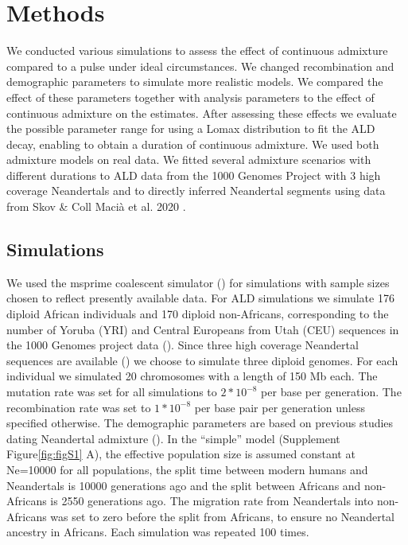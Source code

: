 \documentclass[]{article}
\begin{document}
\section{Methods}\label{methods}

We conducted various simulations to assess the effect of continuous
admixture compared to a pulse under ideal circumstances. We changed
recombination and demographic parameters to simulate more realistic
models. We compared the effect of these parameters together with
analysis parameters to the effect of continuous admixture on the
estimates. After assessing these effects we evaluate the possible
parameter range for using a Lomax distribution to fit the ALD decay,
enabling to obtain a duration of continuous admixture. We used both admixture models on real data. We fitted several admixture scenarios with different durations to ALD data from the 1000 Genomes Project with 3 high coverage Neandertals and to directly inferred Neandertal segments using data from Skov \& Coll Maci\`{a} et al. 2020 \cite{skov_nature_2020}.

\subsection{Simulations}\label{simulations}

We used the msprime coalescent simulator
(\cite{kelleher_efficient_2016}) for simulations with sample sizes
chosen to reflect presently available data. For ALD simulations we simulate 176 diploid
African individuals and 170 diploid non-Africans, corresponding to the
number of Yoruba (YRI) and Central Europeans from Utah (CEU)
sequences in the 1000 Genomes project data
(\cite{the_1000_genomes_project_consortium_global_2015}). Since three
high coverage Neandertal sequences are available
(\cite{prufer_complete_2013,prufer_high-coverage_2017,mafessoni_high_coverage_2020}) we choose to
simulate three diploid genomes. For each individual we simulated 20
chromosomes with a length of 150 Mb each. The mutation rate was set for
all simulations to \(2*10^{-8}\) per base per generation. The
recombination rate was set to \(1*10^{-8}\) per base pair per generation
unless specified otherwise. The demographic parameters are based on
previous studies dating Neandertal admixture
(\cite{sankararaman_date_2012,fu_genome_2014,moorjani_genetic_2016}). In
the ``simple'' model (Supplement Figure\ref{fig:figS1} A), the effective
population size is assumed constant at Ne=10000 for all populations, the
split time between modern humans and Neandertals is 10000 generations
ago and the split between Africans and non-Africans is 2550
generations ago. The migration rate from Neandertals into non-Africans
was set to zero before the split from Africans, to ensure no Neandertal
ancestry in Africans. Each simulation was repeated 100 times. 
\end{document}
